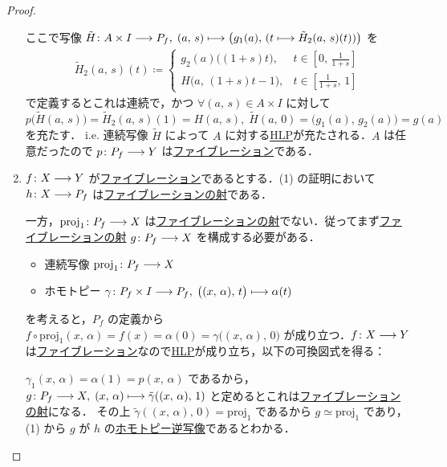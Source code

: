 \documentclass[algtopo_main]{subfiles}
\begin{document}
\begin{proof}
\begin{enumerate}
        ここで写像 $\tilde{H} \colon A \times I \longrightarrow P_f,\; (a,\, s) \longmapsto \bigl( g_1(a),\, (t \longmapsto \tilde{H}_2(a,\, s)(t)) \bigr) $ を
        \begin{align}
            \tilde{H}_2 (a,\, s)(t) \coloneqq
            \begin{cases}
                g_2(a) \bigl( (1+s)t \bigr) , &t \in [0,\, \frac{1}{1+s}] \\
                H \bigl( a,\, (1+s)t - 1 \bigr) , &t \in [\frac{1}{1+s},\, 1]
            \end{cases}
        \end{align}
        で定義するとこれは連続で，かつ $\forall (a,\, s) \in A \times I$ に対して $p\bigl(\tilde{H} (a,\, s)\bigr) = \tilde{H}_2(a,\, s)(1) = H(a,\, s),\; \tilde{H}(a,\, 0) = \bigl( g_1(a),\, g_2(a) \bigr) = g(a)$ を充たす．
        i.e. 連続写像 $\tilde{H}$ によって $A$ に対する\hyperref[def:HLP]{HLP}が充たされる．$A$ は任意だったので $p \colon P_f \longrightarrow Y$ は\hyperref[def:fibration]{ファイブレーション}である．
        \item $f \colon X \longrightarrow Y$ が\hyperref[def:fibration]{ファイブレーション}であるとする．(1) の証明において
        $h \colon X \longrightarrow P_f$ は\hyperref[def:fib-morphism]{ファイブレーションの射}である． 
        
        一方，$\mathrm{proj}_1 \colon P_f \longrightarrow X$ は\hyperref[def:fib-morphism]{ファイブレーションの射}でない．従ってまず\hyperref[def:fib-morphism]{ファイブレーションの射} $g \colon P_f \longrightarrow X$ を構成する必要がある．
        \begin{itemize}
            \item 連続写像 $\mathrm{proj}_1 \colon P_f \longrightarrow X$
            \item ホモトピー $\gamma \colon P_f \times I \longrightarrow P_f,\; \bigl( (x,\, \alpha),\, t \bigr) \longmapsto \alpha(t)$
        \end{itemize}
        を考えると，$P_f$ の定義から $f \circ \mathrm{proj}_1 (x,\, \alpha) = f(x) = \alpha(0) = \gamma \bigl( (x,\, \alpha),\, 0 \bigr)$ が成り立つ．$f \colon X \longrightarrow Y$ は\hyperref[def:fibration]{ファイブレーション}なので\hyperref[def:HLP]{HLP}が成り立ち，以下の可換図式を得る：
        \begin{center}
        \end{center}
        $\gamma_1(x,\, \alpha) = \alpha(1) = p(x,\, \alpha)$ であるから，$g \colon P_f \longrightarrow X,\; (x,\, \alpha) \longmapsto \tilde{\gamma}((x,\, \alpha),\, 1)$ と定めるとこれは\hyperref[def:fib-morphism]{ファイブレーションの射}になる．
        その上 $\tilde{\gamma}((x,\, \alpha),\, 0) = \mathrm{proj}_1$ であるから $g \simeq \mathrm{proj}_1$ であり，(1) から $g$ が $h$ の\hyperref[def:homotopy-basic]{ホモトピー逆写像}であるとわかる．


\end{enumerate}
\end{proof}
\end{document}
